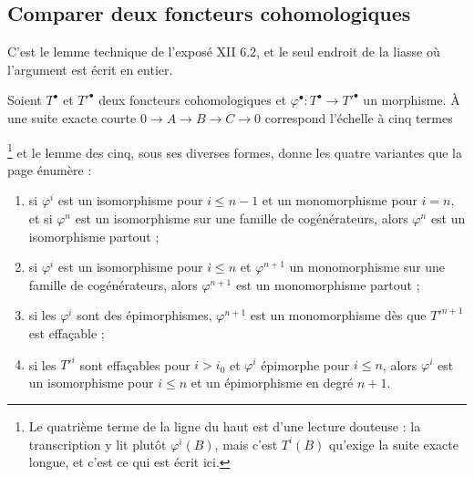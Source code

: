 \documentclass[11pt,a4paper]{article}
\begin{document}
\subsection*{Comparer deux foncteurs cohomologiques}

C'est le lemme technique de l'exposé XII 6.2, et le seul endroit de la liasse
où l'argument est écrit en entier.

Soient $T^{\bullet}$ et $T'^{\bullet}$ deux foncteurs cohomologiques et
$\varphi^{\bullet} : T^{\bullet} \to T'^{\bullet}$ un morphisme. À une suite
exacte courte $0 \to A \to B \to C \to 0$ correspond l'échelle à cinq termes


\footnote{Le quatrième terme de la ligne du haut est d'une lecture douteuse :
la transcription y lit plutôt $\varphi^{i}(B)$, mais c'est $T^{i}(B)$
qu'exige la suite exacte longue, et c'est ce qui est écrit ici.} et le lemme
des cinq, sous ses diverses formes, donne les quatre variantes que la page
énumère :

\begin{enumerate}
\item[a)] si $\varphi^{i}$ est un isomorphisme pour $i \leqslant n-1$ et un
monomorphisme pour $i = n$, et si $\varphi^{n}$ est un isomorphisme sur une
famille de cogénérateurs, alors $\varphi^{n}$ est un isomorphisme partout ;
\item[b)] si $\varphi^{i}$ est un isomorphisme pour $i \leqslant n$ et
$\varphi^{n+1}$ un monomorphisme sur une famille de cogénérateurs, alors
$\varphi^{n+1}$ est un monomorphisme partout ;
\item[c)] si les $\varphi^{i}$ sont des épimorphismes, $\varphi^{n+1}$ est un
monomorphisme dès que $T'^{n+1}$ est effaçable ;
\item[c$'$)] si les $T'^{i}$ sont effaçables pour $i > i_{0}$ et $\varphi^{i}$
épimorphe pour $i \leqslant n$, alors $\varphi^{i}$ est un isomorphisme pour
$i \leqslant n$ et un épimorphisme en degré $n+1$.
\end{enumerate}
\end{document}
